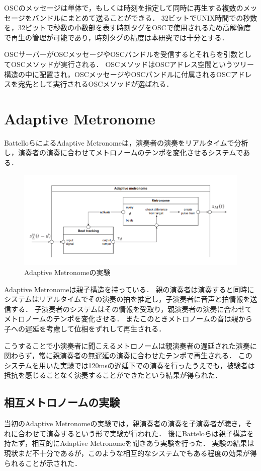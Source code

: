 OSCのメッセージは単体で，もしくは時刻を指定して同時に再生する複数のメッセージをバンドルにまとめて送ることができる．
32ビットでUNIX時間での秒数を，32ビットで秒数の小数部を表す時刻タグをOSCで使用されるため高解像度で再生の管理が可能であり，時刻タグの精度は本研究では十分とする．

OSCサーバーがOSCメッセージやOSCバンドルを受信するとそれらを引数としてOSCメソッドが実行される．
OSCメソッドはOSCアドレス空間というツリー構造の中に配置され，OSCメッセージやOSCバンドルに付属されるOSCアドレスを宛先として実行されるOSCメソッドが選ばれる．

\section{Adaptive Metronome}
BattelloらによるAdaptive Metronome\cite{admet}\cite{admet:experiment}は，演奏者の演奏をリアルタイムで分析し，演奏者の演奏に合わせてメトロノームのテンポを変化させるシステムである．

\begin{figure}[htbp]
  \centering
  \includegraphics[width=0.8\linewidth]{src/admet.png}
  \caption{Adaptive Metronomeの実験\cite{admet}}
  \label{fig:admet}
\end{figure}

Adaptive Metronomeは親子構造を持っている．
親の演奏者は演奏すると同時にシステムはリアルタイムでその演奏の拍を推定し，子演奏者に音声と拍情報を送信する．
子演奏者のシステムはその情報を受取り，親演奏者の演奏に合わせてメトロノームのテンポを変化させる．
またこのときメトロノームの音は親から子への遅延を考慮して位相をずれして再生される．

こうすることで小演奏者に聞こえるメトロノームは親演奏者の遅延された演奏に関わらず，常に親演奏者の無遅延の演奏に合わせたテンポで再生される．
このシステムを用いた実験では120msの遅延下での演奏を行ったうえでも，被験者は抵抗を感じることなく演奏することができたという結果が得られた．\cite{admet}

\subsection{相互メトロノームの実験}
当初のAdaptive Metronomeの実験では，親演奏者の演奏を子演奏者が聴き，それに合わせて演奏するという形で実験が行われた．
後にBatteloらは親子構造を持たず，相互的にAdaptive Metronomeを聞きあう実験を行った．
実験の結果は現状まだ不十分であるが，このような相互的なシステムでもある程度の効果が得られることが示された．

